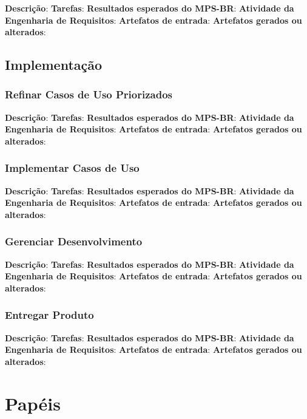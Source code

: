 \textbf{Descrição}:
\textbf{Tarefas}:
\textbf{Resultados esperados do MPS-BR}:
\textbf{Atividade da Engenharia de Requisitos}:
\textbf{Artefatos de entrada}:
\textbf{Artefatos gerados ou alterados}:

\subsection{Implementação}

\subsubsection{Refinar Casos de Uso Priorizados}

\textbf{Descrição}:
\textbf{Tarefas}:
\textbf{Resultados esperados do MPS-BR}:
\textbf{Atividade da Engenharia de Requisitos}:
\textbf{Artefatos de entrada}:
\textbf{Artefatos gerados ou alterados}:

\subsubsection{Implementar Casos de Uso}

\textbf{Descrição}:
\textbf{Tarefas}:
\textbf{Resultados esperados do MPS-BR}:
\textbf{Atividade da Engenharia de Requisitos}:
\textbf{Artefatos de entrada}:
\textbf{Artefatos gerados ou alterados}:

\subsubsection{Gerenciar Desenvolvimento}

\textbf{Descrição}:
\textbf{Tarefas}:
\textbf{Resultados esperados do MPS-BR}:
\textbf{Atividade da Engenharia de Requisitos}:
\textbf{Artefatos de entrada}:
\textbf{Artefatos gerados ou alterados}:

\subsubsection{Entregar Produto}

\textbf{Descrição}:
\textbf{Tarefas}:
\textbf{Resultados esperados do MPS-BR}:
\textbf{Atividade da Engenharia de Requisitos}:
\textbf{Artefatos de entrada}:
\textbf{Artefatos gerados ou alterados}:

\section{Papéis}

